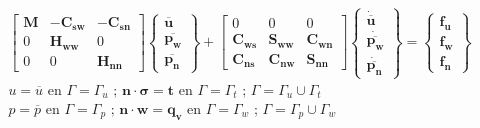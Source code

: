 \begin{ceqn} %
\begin{subequations}\label{eq:equ374}
\begin{gather}
\begin{bmatrix}
       \mathbf{M}  & \mathbf{-C_{sw}}   & \mathbf{-C_{sn}}\\[0.3em]
       0		   & \mathbf{H_{ww}}    & 0\\[0.3em]
       0		   & 0                  & \mathbf{H_{nn}}
\end{bmatrix}
\begin{Bmatrix}
       \mathbf{\overline{u}}    \\[0.3em]
       \mathbf{\overline{p_w}}    \\[0.3em]
       \mathbf{\overline{p_n}}
\end{Bmatrix}
+
\begin{bmatrix}
       0             & 0             & 0 \\[0.3em]
       \mathbf{C_{ws}}  & \mathbf{S_{ww}}    & \mathbf{C_{wn}} \\[0.3em]
       \mathbf{C_{ns}}  & \mathbf{C_{nw}}    & \mathbf{S_{nn}}
\end{bmatrix}
\begin{Bmatrix}
       \mathbf{\dot{\overline{u}}}    \\[0.3em]
       \mathbf{\dot{\overline{p_w}}}    \\[0.3em]
       \mathbf{\dot{\overline{p_n}}}
\end{Bmatrix}
= 
\begin{Bmatrix}
       \mathbf{f_u}    \\[0.3em]
       \mathbf{f_w}    \\[0.3em]
       \mathbf{f_n}
\end{Bmatrix} \label{eq:equ374a}\\[12pt]
u = \overline{u} \text{  en  } \Gamma = \Gamma_u \text{ ;  } \mathbf{n}\cdot\mathbf{\sigma}=\mathbf{t} \text{  en  } \Gamma = \Gamma_t \text{ ; } \Gamma = \Gamma_u \cup \Gamma_t \label{eq:equ374b}\\[12pt]
p = \overline{p} \text{  en  } \Gamma = \Gamma_p \text{ ;  } \mathbf{n}\cdot\mathbf{w}=\mathbf{q_v} \text{  en  } \Gamma = \Gamma_w \text{ ; } \Gamma = \Gamma_p \cup \Gamma_w \label{eq:equ374c}
\end{gather}
\end{subequations}
\end{ceqn}
